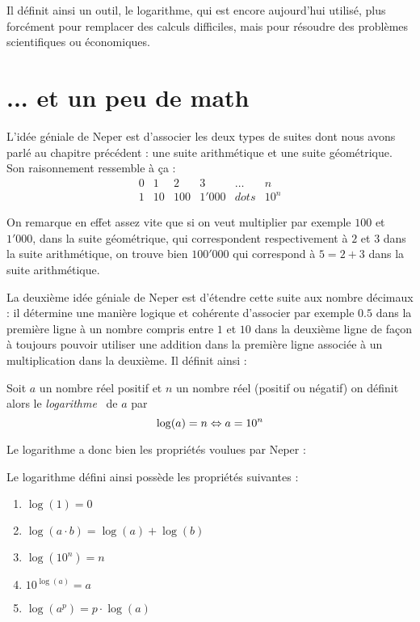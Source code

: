 Il définit ainsi un outil, le logarithme, qui est encore aujourd'hui utilisé, plus forcément pour remplacer des calculs difficiles, mais pour résoudre des problèmes scientifiques ou économiques.

\section{... et un peu de math}

L'idée géniale de Neper est d'associer les deux types de suites dont nous avons parlé au chapitre précédent : une suite arithmétique et une suite géométrique. Son raisonnement ressemble à ça :
$$
\begin{array}{rrrrrr}
0 & 1 & 2 & 3 & \dots & n \\
1 & 10 & 100 & 1'000 & dots & 10^n
\end{array}
$$

On remarque en effet assez vite que si on veut multiplier par exemple $100$ et $1'000$, dans la suite géométrique, qui correspondent respectivement à $2$ et $3$ dans la suite arithmétique, on trouve bien $100'000$ qui correspond à $5 = 2+3$ dans la suite arithmétique.

La deuxième idée géniale de Neper est d'étendre cette suite aux nombre décimaux : il détermine une manière logique et cohérente d'associer par exemple $0.5$ dans la première ligne à un nombre compris entre $1$ et $10$ dans la deuxième ligne de façon à toujours pouvoir utiliser une addition dans la première ligne associée à un multiplication dans la deuxième. Il définit ainsi :

\begin{definition}
Soit $a$ un nombre réel positif et $n$ un nombre réel (positif ou négatif) on définit alors le \emph{logarithme}~ de $a$ par
$$
\log(a) = n \Leftrightarrow a = 10^n
$$
\end{definition}

Le logarithme a donc bien les propriétés voulues par Neper :

\begin{proposition}
Le logarithme défini ainsi possède les propriétés suivantes :
\begin{enumerate}
\item $\log(1) = 0$
\item $\log(a\cdot b) = \log(a) + \log (b)$
\item $\log(10^n) = n$
\item $10^{\log(a)} = a$
\item $\log\left(a^p\right) = p\cdot \log(a)$
\end{enumerate}
\end{proposition}

